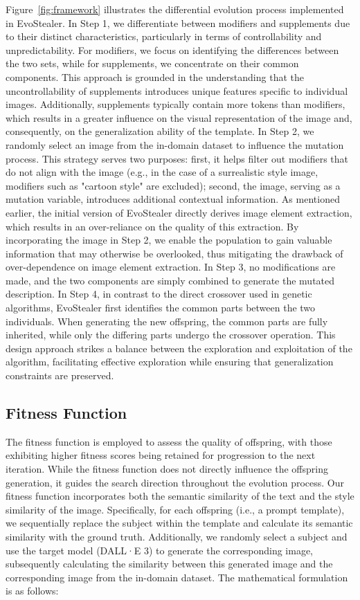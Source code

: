 Figure~\ref{fig:framework} illustrates the differential evolution process implemented in EvoStealer. In Step 1, we differentiate between modifiers and supplements due to their distinct characteristics, particularly in terms of controllability and unpredictability. For modifiers, we focus on identifying the differences between the two sets, while for supplements, we concentrate on their common components. This approach is grounded in the understanding that the uncontrollability of supplements introduces unique features specific to individual images. Additionally, supplements typically contain more tokens than modifiers, which results in a greater influence on the visual representation of the image and, consequently, on the generalization ability of the template. In Step 2, we randomly select an image from the in-domain dataset to influence the mutation process. This strategy serves two purposes: first, it helps filter out modifiers that do not align with the image (e.g., in the case of a surrealistic style image, modifiers such as "cartoon style" are excluded); second, the image, serving as a mutation variable, introduces additional contextual information. As mentioned earlier, the initial version of EvoStealer directly derives image element extraction, which results in an over-reliance on the quality of this extraction. By incorporating the image in Step 2, we enable the population to gain valuable information that may otherwise be overlooked, thus mitigating the drawback of over-dependence on image element extraction. In Step 3, no modifications are made, and the two components are simply combined to generate the mutated description. In Step 4, in contrast to the direct crossover used in genetic algorithms, EvoStealer first identifies the common parts between the two individuals. When generating the new offspring, the common parts are fully inherited, while only the differing parts undergo the crossover operation. This design approach strikes a balance between the exploration and exploitation of the algorithm, facilitating effective exploration while ensuring that generalization constraints are preserved.



\subsection{Fitness Function} \label{section_fitness}
The fitness function is employed to assess the quality of offspring, with those exhibiting higher fitness scores being retained for progression to the next iteration. While the fitness function does not directly influence the offspring generation, it guides the search direction throughout the evolution process. Our fitness function incorporates both the semantic similarity of the text and the style similarity of the image. Specifically, for each offspring (i.e., a prompt template), we sequentially replace the subject within the template and calculate its semantic similarity with the ground truth. Additionally, we randomly select a subject and use the target model (DALL·E 3) to generate the corresponding image, subsequently calculating the similarity between this generated image and the corresponding image from the in-domain dataset. The mathematical formulation is as follows:

